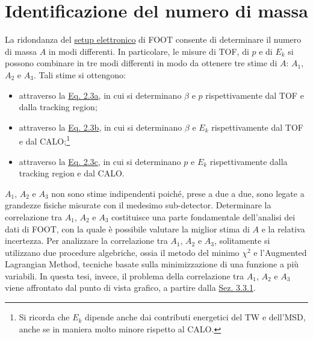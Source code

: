 \documentclass[12pt,a4paper,twoside]{report}
\begin{document}
	\section{Identificazione del numero di massa}
	La ridondanza del \hyperref[sec:setupElettronico]{setup elettronico} di FOOT consente di determinare il numero di massa $A$ in modi differenti. In particolare, le misure di TOF, di $p$ e di $E_k$ si possono combinare in tre modi differenti in modo da ottenere tre stime di $A$: $A_1$, $A_2$ e $A_3$. Tali stime si ottengono:
	\begin{itemize}
		\item attraverso la \hyperref[eq:a1]{Eq. 2.3a}, in cui si determinano $\beta$ e $p$ rispettivamente dal TOF e dalla tracking region;
		\item attraverso la \hyperref[eq:a2]{Eq. 2.3b}, in cui si determinano $\beta$ e $E_k$ rispettivamente dal TOF e dal CALO;\footnote{Si ricorda che $E_k$ dipende anche dai contributi energetici del TW e dell'MSD, anche se in maniera molto minore rispetto al CALO.}
		\item attraverso la \hyperref[eq:a3]{Eq. 2.3c}, in cui si determinano $p$ e $E_k$ rispettivamente dalla tracking region e dal CALO.
	\end{itemize}
	$A_1$, $A_2$ e $A_3$ non sono stime indipendenti poiché, prese a due a due, sono legate a grandezze fisiche misurate con il medesimo sub-detector. Determinare la correlazione tra $A_1$, $A_2$ e $A_3$ costituisce una parte fondamentale dell'analisi dei dati di FOOT, con la quale è possibile valutare la miglior stima di $A$ e la relativa incertezza. Per analizzare la correlazione tra $A_1$, $A_2$ e $A_3$, solitamente si utilizzano due procedure algebriche, ossia il metodo del minimo $\chi^2$ e l'Augmented Lagrangian Method, tecniche basate sulla minimizzazione di una funzione a più variabili. In questa tesi, invece, il problema della correlazione tra $A_1$, $A_2$ e $A_3$ viene affrontato dal punto di vista grafico, a partire dalla \hyperref[sec:correlation_number_mass]{Sez. 3.3.1}.
	
\end{document}
